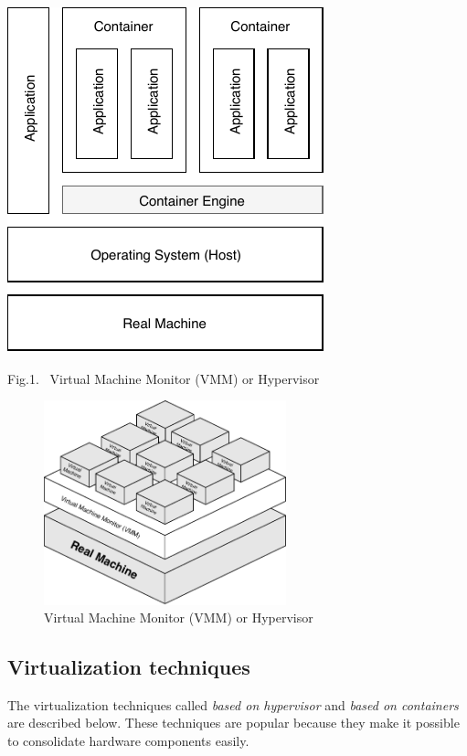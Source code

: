 \begin{center}
 \includegraphics[]{images/container-BasedVirtualization.pdf}
 \vspace{2mm}
 \parbox[c]{8.3cm}{\footnotesize{Fig.1.~}  Virtual Machine Monitor (VMM) or Hypervisor}%
\label{fig:VMM}
\end{center}

	
\begin{figure}[!hbtp]
 \centering
 \includegraphics[width=7cm]{images/VMM.pdf}
 \vspace{-0.2cm}
 \caption{Virtual Machine Monitor (VMM) or Hypervisor}
 \label{fig:VMM}
\end{figure}

	\subsection{Virtualization techniques}
	
	The virtualization techniques called \textit{based on hypervisor} and \textit {based on containers} are described below. 
	These techniques are popular because they make it possible to consolidate hardware components easily.
	
